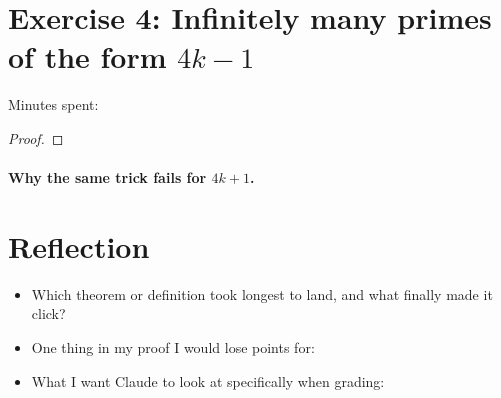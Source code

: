 \documentclass[11pt]{article}
\begin{document}

\section*{Exercise 4: Infinitely many primes of the form $4k-1$}
Minutes spent: \blank[1cm]

\begin{proof}
\end{proof}

\paragraph{Why the same trick fails for $4k+1$.}

\section*{Reflection}
\begin{itemize}
  \item Which theorem or definition took longest to land, and what finally made it click?
  \item One thing in my proof I would lose points for:
  \item What I want Claude to look at specifically when grading:
\end{itemize}
\end{document}
